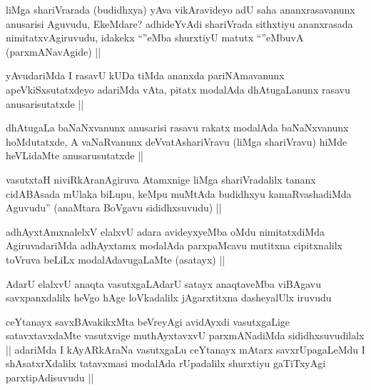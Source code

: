 \begin{artha}
liMga shariVrarada (budidhxya) yAva vikAravideyo adU saha ananxrasavanunx anusarisi Aguvudu, EkeMdare? adhideYvAdi shariVrada sithxtiyu ananxrasada nimitatxvAgiruvudu, idakekx ``\stext''eMba shurxtiyU matutx ``\stext''eMbuvA (parxmANavAgide) ||
\end{artha}

\begin{artha}
yAvudariMda I rasavU kUDa tiMda ananxda pariNAmavanunx apeVkiSxsutatxdeyo adariMda vAta, pitatx modalAda dhAtugaLanunx rasavu anusarisutatxde ||
\end{artha}


\begin{artha}
dhAtugaLa baNaNxvanunx anusarisi rasavu rakatx modalAda baNaNxvanunx hoMdutatxde, A vaNaRvanunx deVvatAshariVravu (liMga shariVravu) hiMde heVLidaMte anusarusutatxde ||
\end{artha}


\begin{artha}
vasutxtaH niviRkAranAgiruva Atamxnige liMga shariVradalilx tananx cidABAsada mUlaka biLupu, keMpu muMtAda budidhxyu kamaRvashadiMda Aguvudu'' (anaMtara BoVgavu sididhxsuvudu) ||
\end{artha}


\begin{artha}
adhAyxtAmxnalelxV elalxvU adara avideyxyeMba oMdu nimitatxdiMda AgiruvadariMda adhAyxtamx modalAda parxpaMcavu mutitxna cipitxnalilx toVruva beLiLx modalAdavugaLaMte (asatayx) ||
\end{artha}


\begin{artha}
AdarU elalxvU anaqta vasutxgaLAdarU satayx anaqtaveMba viBAgavu savxpanxdalilx heVgo hAge loVkadalilx jAgarxtitxna dasheyalUlx iruvudu
\end{artha}

\begin{artha}
ceYtanayx savxBAvakikxMta beVreyAgi avidAyxdi vasutxgaLige satavxtavxdaMte vasutxvige muthAyxtavxvU parxmANadiMda sididhxsuvudilalx || adariMda I kAyARkAraNa vasutxgaLu ceYtanayx mAtarx savxrUpagaLeMdu I shAsatxrXdalilx tatavxmasi modalAda rUpadalilx shurxtiyu gaTiTxyAgi parxtipAdisuvudu ||
\end{artha}

